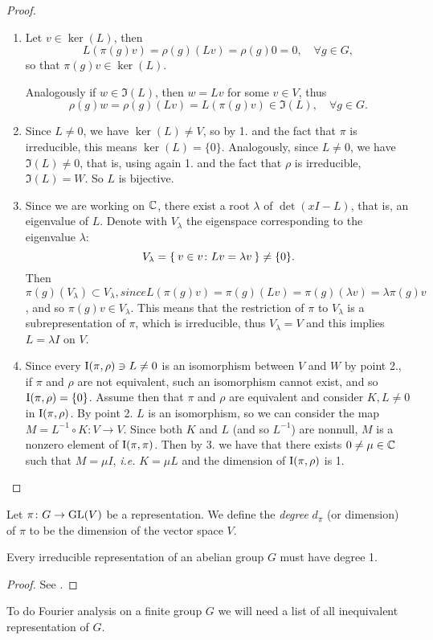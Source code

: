 \begin{proof}~ 
\begin{enumerate}
\item Let $v \in \ker(L)$, then 
\[
L(\pi(g)v)=\rho(g)(Lv)=\rho(g)0=0, \quad \forall g\in G,
\]
so that $\pi(g)v\in \ker(L)$.

Analogously if $w \in \Im(L)$, then $w=Lv$ for some $v\in V$, thus
\[
\rho(g)w=\rho(g)(Lv)=L(\pi(g)v)\in \Im(L), \quad \forall g\in G.
\]


\item Since $L\neq 0$, we have $\ker(L)\neq V$, so by 1. and the fact that $\pi$ is irreducible, this means $\ker(L)=\{0\}$. Analogously, since $L\neq 0$, we have $\Im(L)\neq 0$, that is, using again 1. and the fact that $\rho$ is irreducible, $\Im(L)=W$. So $L$ is bijective.
\item Since we are working on ${\mathbb C}$, there exist a root $\lambda$ of $\det(xI-L)$, that is, an eigenvalue of $L$. Denote with $V_\lambda$ the eigenspace corresponding to the eigenvalue $\lambda$:
\[
V_\lambda=\Set{v\in v \colon Lv=\lambda v}\neq \{0\}.
\] 
Then $\pi(g)(V_\lambda)\subset V_\lambda, since L(\pi(g)v)=\pi(g)(Lv)=\pi(g)(\lambda  v)=\lambda\pi(g) v$, and so $\pi(g)v\in V_\lambda$. This means that the restriction of $\pi$ to $V_\lambda$ is a subrepresentation of $\pi$, which is irreducible, thus $V_\lambda = V$ and this implies $L=\lambda I$ on $V$. 
\item Since every $\operatorname{I}(\pi,\rho)\ni L\neq 0$ is an isomorphism between $V$ and $W$ by point 2., if $\pi$ and $\rho$ are not equivalent, such an isomorphism cannot exist, and so $\operatorname{I}(\pi,\rho)=\{0\}$. Assume then that $\pi$ and $\rho$ are equivalent and consider $K,L\neq 0$ in  $\operatorname{I}(\pi,\rho)$. By point 2. $L$ is an isomorphism, so we can consider the map $M=L^{-1} \circ K\colon V\rightarrow V$. Since both $K$ and $L$ (and so $L^{-1}$) are nonnull, $M$ is a nonzero element of $\operatorname{I}(\pi,\pi)$. Then by 3. we have that there exists $0\neq \mu\in {\mathbb C}$ such that $M=\mu I$, \emph{i.e.} $K=\mu L$ and the dimension of $\operatorname{I}(\pi,\rho)$ is 1.
\end{enumerate}

\end{proof}
\begin{defn}
Let $\pi\colon G \rightarrow \operatorname{GL}(V)$ be a representation. We define the \emph{degree} $d_{\pi}$ (or dimension) of $\pi$ to be the dimension of the vector space $V$.
\end{defn}
\begin{cor}
Every irreducible representation of an abelian group $G$ must have degree 1.
\end{cor}
\begin{proof}
See \cite[p. 249]{terras_1999}.
\end{proof}
To do Fourier analysis on a finite group $G$ we will need a list of all inequivalent representation of $G$.

